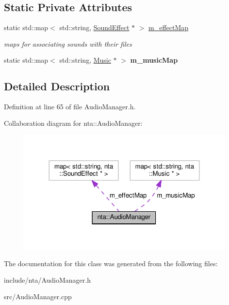 \subsection*{Static Private Attributes}
\begin{DoxyCompactItemize}
\item 
\mbox{\label{classnta_1_1AudioManager_a745f3ef1216f7e6bf848a9eb4054c5b4}} 
static std\+::map$<$ std\+::string, \hyperlink{classnta_1_1SoundEffect}{Sound\+Effect} $\ast$ $>$ \hyperlink{classnta_1_1AudioManager_a745f3ef1216f7e6bf848a9eb4054c5b4}{m\+\_\+effect\+Map}
\begin{DoxyCompactList}\small\item\em maps for associating sounds with their files \end{DoxyCompactList}\item 
\mbox{\label{classnta_1_1AudioManager_ae301717a98c3a7bb0ca0b588c270b122}} 
static std\+::map$<$ std\+::string, \hyperlink{classnta_1_1Music}{Music} $\ast$ $>$ {\bfseries m\+\_\+music\+Map}
\end{DoxyCompactItemize}


\subsection{Detailed Description}


Definition at line 65 of file Audio\+Manager.\+h.



Collaboration diagram for nta\+:\+:Audio\+Manager\+:\nopagebreak
\begin{figure}[H]
\begin{center}
\leavevmode
\includegraphics[width=312pt]{d9/d95/classnta_1_1AudioManager__coll__graph}
\end{center}
\end{figure}


The documentation for this class was generated from the following files\+:\begin{DoxyCompactItemize}
\item 
include/nta/Audio\+Manager.\+h\item 
src/Audio\+Manager.\+cpp\end{DoxyCompactItemize}
